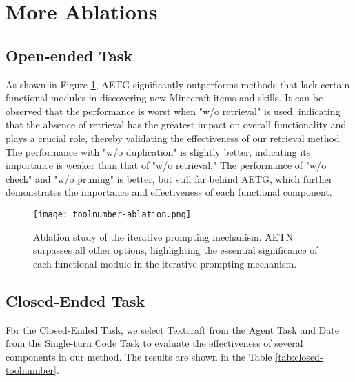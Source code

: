 \section{More Ablations}
\label{app:apablation}
\subsection{Open-ended Task}
\label{subsec:open-ablation}

As shown in Figure \ref{fig:ablation}, AETG significantly outperforms methods that lack certain functional modules in discovering new Minecraft items and skills. It can be observed that the performance is worst when "w/o retrieval" is used, indicating that the absence of retrieval has the greatest impact on overall functionality and plays a crucial role, thereby validating the effectiveness of our retrieval method. The performance with "w/o duplication" is slightly better, indicating its importance is weaker than that of "w/o retrieval." The performance of "w/o check" and "w/o pruning" is better, but still far behind AETG, which further demonstrates the importance and effectiveness of each functional component.

\vskip -0.1in
\begin{figure}[H]
\begin{center}
\centerline{\texttt{[image: toolnumber-ablation.png]}}
\caption{Ablation study of the iterative prompting mechanism. AETN surpasses all other options, highlighting the essential significance of each functional module in the iterative prompting mechanism.}
\label{fig:ablation}
\end{center}
\vskip -0.3in
\end{figure}


\subsection{Closed-Ended Task}
\label{subsec:closed-ended}
For the Closed-Ended Task, we select Textcraft from the Agent Task and Date from the Single-turn Code Task to evaluate the effectiveness of several components in our method. The results are shown in the Table \ref{tab:closed-toolnumber}.

